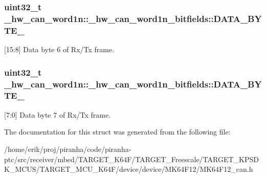 \subsubsection[{\texorpdfstring{D\+A\+T\+A\+\_\+\+B\+Y\+T\+E\+\_\+6}{DATA_BYTE_6}}]{\setlength{\rightskip}{0pt plus 5cm}uint32\+\_\+t \+\_\+hw\+\_\+can\+\_\+word1n\+::\+\_\+hw\+\_\+can\+\_\+word1n\+\_\+bitfields\+::\+D\+A\+T\+A\+\_\+\+B\+Y\+T\+E\+\_}\hypertarget{struct__hw__can__word1n_1_1__hw__can__word1n__bitfields_af7dc3f0293c09eb1f11f713586be093b}{}\label{struct__hw__can__word1n_1_1__hw__can__word1n__bitfields_af7dc3f0293c09eb1f11f713586be093b}
\mbox{[}15\+:8\mbox{]} Data byte 6 of Rx/\+Tx frame. 
\subsubsection[{\texorpdfstring{D\+A\+T\+A\+\_\+\+B\+Y\+T\+E\+\_\+7}{DATA_BYTE_7}}]{\setlength{\rightskip}{0pt plus 5cm}uint32\+\_\+t \+\_\+hw\+\_\+can\+\_\+word1n\+::\+\_\+hw\+\_\+can\+\_\+word1n\+\_\+bitfields\+::\+D\+A\+T\+A\+\_\+\+B\+Y\+T\+E\+\_}\hypertarget{struct__hw__can__word1n_1_1__hw__can__word1n__bitfields_a49035321e2d64a6fee53c56a611de830}{}\label{struct__hw__can__word1n_1_1__hw__can__word1n__bitfields_a49035321e2d64a6fee53c56a611de830}
\mbox{[}7\+:0\mbox{]} Data byte 7 of Rx/\+Tx frame. 

The documentation for this struct was generated from the following file\+:\begin{DoxyCompactItemize}
\item 
/home/erik/proj/piranha/code/piranha-\/ptc/src/receiver/mbed/\+T\+A\+R\+G\+E\+T\+\_\+\+K64\+F/\+T\+A\+R\+G\+E\+T\+\_\+\+Freescale/\+T\+A\+R\+G\+E\+T\+\_\+\+K\+P\+S\+D\+K\+\_\+\+M\+C\+U\+S/\+T\+A\+R\+G\+E\+T\+\_\+\+M\+C\+U\+\_\+\+K64\+F/device/device/\+M\+K64\+F12/M\+K64\+F12\+\_\+can.\+h\end{DoxyCompactItemize}
